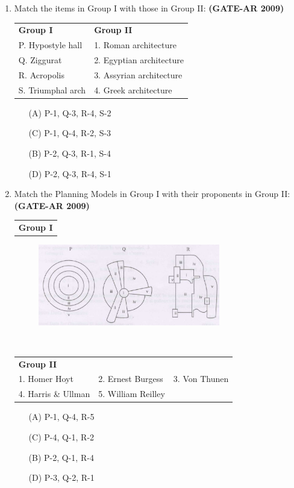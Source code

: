 \documentclass[a4paper,10pt]{article}
\begin{document}
\begin{enumerate}[label=Q.\arabic]
    \item Match the items in Group I with those in Group II: \textbf{(GATE-AR 2009)} \\
    \begin{tabular}{ l l }
	\textbf{Group I} & \textbf{Group II} \\
	P. Hypostyle hall & 1. Roman architecture \\
	Q. Ziggurat & 2. Egyptian architecture \\
	R. Acropolis & 3. Assyrian architecture \\
	S. Triumphal arch & 4. Greek architecture \\
	\end{tabular}
	\begin{multicols}{2}
	\begin{itemize}
        \item[(A)] P-1, Q-3, R-4, S-2
        \item[(C)] P-1, Q-4, R-2, S-3
        \item[(B)] P-2, Q-3, R-1, S-4
        \item[(D)] P-2, Q-3, R-4, S-1
    \end{itemize}
	\end{multicols}

\newpage

    \item Match the Planning Models in Group I with their proponents in Group II: \textbf{(GATE-AR 2009)} \\
    \begin{tabular}{ l }
	\textbf{Group I} \\
	\end{tabular}
	\begin{figure}[h!]
        \centering
        \includegraphics[width=0.75\textwidth]{Pic03.jpg}
	\end{figure} \\
	\begin{tabular}{ l l l }
	\textbf{Group II} & & \\
	1. Homer Hoyt & 2. Ernest Burgess & 3. Von Thunen \\
	4. Harris \& Ullman & 5. William Reilley & \\
	\end{tabular}
	\begin{multicols}{2}
	\begin{itemize}
        \item[(A)] P-1, Q-4, R-5
        \item[(C)] P-4, Q-1, R-2
        \item[(B)] P-2, Q-1, R-4
        \item[(D)] P-3, Q-2, R-1
    \end{itemize}
	\end{multicols}


\end{enumerate}
\end{document}
